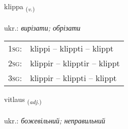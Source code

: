 \documentclass[frontgrid, backgrid]{flacards}\usepackage[]{graphicx}\usepackage[]{xcolor}
\begin{document}
\renewcommand{\flhead}{\vskip5pt \fboxsep=0pt {\small\bfseries\footnotesize Sagnorð | дієслово}}
\renewcommand{\fcfoot}{\vskip5pt \fboxsep=0pt \hspace{2pt}{\small\bfseries\footnotesize 3K}}

\renewcommand{\blhead}{\vskip5pt {\small\bfseries\footnotesize Sagnorð | дієслово }}
\renewcommand{\bcfoot}{\vskip5pt \hspace{2pt}{\small\bfseries\footnotesize 3K}}


{klippa \small{\textsubscript{(\textit{v.})}} \\[1ex] %
\textphonetic{[kʰlɪhpa]} \\
ukr.: \emph{вирізати; обрізати} \\  [2ex]
\renewcommand*{\arraystretch}{0.8}
\begin{tabular}{p{1cm}l}
\textsc{1sg}: & klippi -- klippti -- klippt \\ 
\textsc{2sg}: & klippir -- klipptir -- klippt \\ 
\textsc{3sg}: & klippir -- klippti -- klippt \\ 
\end{tabular}
}

\renewcommand{\flhead}{\vskip5pt \fboxsep=0pt {\small\bfseries\footnotesize Lýsingarorð | прикметник}}
\renewcommand{\fcfoot}{\vskip5pt \fboxsep=0pt \hspace{2pt}{\small\bfseries\footnotesize 3K}}

\renewcommand{\blhead}{\vskip5pt {\small\bfseries\footnotesize Lýsingarorð | прикметник }}
\renewcommand{\bcfoot}{\vskip5pt \hspace{2pt}{\small\bfseries\footnotesize 3K}}


{vitlaus \small{\textsubscript{(\textit{adj.})}} \\[1ex] %
\textphonetic{[vɪhtlœis]} \\
ukr.: \emph{божевільний; неправильний} \\  [2ex]
\renewcommand*{\arraystretch}{0.8}
}
\end{document}

